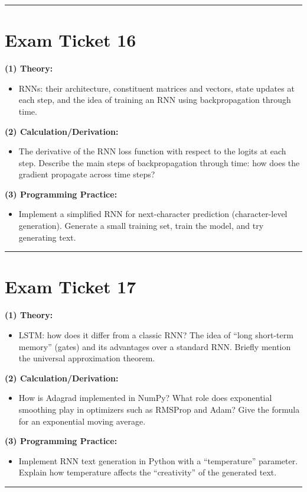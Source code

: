 \documentclass[a4paper,12pt]{article}
\begin{document}
\noindent\rule{\textwidth}{0.4pt}
\newpage

\section*{Exam Ticket 16}
\textbf{(1) Theory:}
\begin{itemize}
  \item RNNs: their architecture, constituent matrices and vectors, state updates at each step, and the idea of training an RNN using backpropagation through time.
\end{itemize}

\textbf{(2) Calculation/Derivation:}
\begin{itemize}
  \item The derivative of the RNN loss function with respect to the logits at each step. Describe the main steps of backpropagation through time: how does the gradient propagate across time steps?
\end{itemize}

\textbf{(3) Programming Practice:}
\begin{itemize}
  \item Implement a simplified RNN for next-character prediction (character-level generation). Generate a small training set, train the model, and try generating text.
\end{itemize}

\noindent\rule{\textwidth}{0.4pt}
\newpage

\section*{Exam Ticket 17}
\textbf{(1) Theory:}
\begin{itemize}
  \item LSTM: how does it differ from a classic RNN? The idea of ``long short-term memory'' (gates) and its advantages over a standard RNN. Briefly mention the universal approximation theorem.
\end{itemize}

\textbf{(2) Calculation/Derivation:}
\begin{itemize}
  \item How is Adagrad implemented in NumPy? What role does exponential smoothing play in optimizers such as RMSProp and Adam? Give the formula for an exponential moving average.
\end{itemize}

\textbf{(3) Programming Practice:}
\begin{itemize}
  \item Implement RNN text generation in Python with a ``temperature'' parameter. Explain how temperature affects the ``creativity'' of the generated text.
\end{itemize}

\noindent\rule{\textwidth}{0.4pt}
\end{document}

